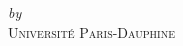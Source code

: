 \begin{titlepage}
  \vspace*{5cm}
  \makeatletter
  \begin{center}
    \begin{Huge}
      \@title
    \end{Huge}\\[0.1cm]
    \begin{Large}
      \@subtitle
    \end{Large} ~\\
    \emph{by} ~\\
    \@author
    \vfill
    \textsc{Université Paris-Dauphine}
  \end{center}
  \makeatother
\end{titlepage}

\newpage
\null
\thispagestyle{empty}
\newpage
